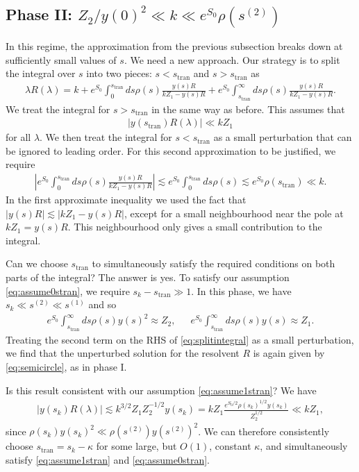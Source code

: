 \documentclass[12pt]{article}
\newcommand{\stran}{s_{\text{tran}}}
\newcommand{\smax}{s_k}
\numberwithin{equation}{section}
\begin{document}
\subsection*{Phase II: $Z_2/y(0)^2 \ll k \ll e^{S_0} \rho( s^{(2)})$}
In this regime, the approximation from the previous subsection breaks down at sufficiently small values of $s$. We need a new approach. Our strategy is to split the integral over $s$ into two pieces: $s < \stran$ and $s >s_\text{tran}$ as
\begin{align}\label{eq:splitintegral}
\lambda R(\lambda)  = k + e^{S_0}\int_0^{\stran} ds \rho(s) \frac{y(s) R}{k Z_1 - y(s) R} +  e^{S_0}\int_{\stran}^\infty ds \rho(s) \frac{y(s) R}{k Z_1 - y(s) R}.
\end{align}
We treat the integral for $s > \stran$ in the same way as before. This assumes that
\begin{align}\label{eq:assume1stran}
|y(\stran) R(\lambda)| \ll k Z_1
\end{align}
for all $\lambda$. We then treat the integral for $s < \stran$ as a small perturbation that can be ignored to leading order. For this second approximation to be justified, we require
\begin{align} \label{eq:assume0stran}
\left|e^{S_0}\int_0^{\stran} ds \rho(s) \frac{y(s) R}{k Z_1 - y(s) R}\right| \lesssim e^{S_0}\int_0^{\stran} ds \rho(s) \lesssim e^{S_0} \rho(\stran) \ll k.
\end{align}
In the first approximate inequality we used the fact that $|y(s) R| \lesssim |k Z_1 - y(s) R|$, except for a small neighbourhood near the pole at $k Z_1 = y(s) R$. This neighbourhood only gives a small contribution to the integral.

Can we choose $\stran$ to simultaneously satisfy the required conditions on both parts of the integral? The answer is yes. 
To satisfy our assumption \eqref{eq:assume0stran}, we require $\smax - \stran \gg 1$. In this phase, we have $\smax \ll s^{(2)} \ll s^{(1)}$ and so
\begin{align}
e^{S_0} \int_{\stran}^\infty ds  \rho(s) y(s)^2 \approx Z_2, \,\,\,\,\,\,\,\,\, e^{S_0} \int_{\stran}^\infty ds  \rho(s) y(s) \approx Z_1.
\end{align}
Treating the second term on the RHS of \eqref{eq:splitintegral} as a small perturbation, we find that the unperturbed solution for the resolvent $R$ is again given by \eqref{eq:semicircle}, as in phase I. 

Is this result consistent with our assumption \eqref{eq:assume1stran}? We have
\begin{align}
|y(\smax) R(\lambda)| \lesssim k^{3/2} Z_1 Z_2^{-1/2} y(\smax) = k Z_1 \frac{e^{S_0 /2} \rho({\smax})^{1/2} y(\smax)}{Z_2^{1/2}} \ll k Z_1,
\end{align}
since $\rho(\smax) y(\smax)^2 \ll \rho(s^{(2)}) y(s^{(2)})^2$. We can therefore consistently choose $\stran = \smax - \kappa$ for some large, but $O(1)$, constant $\kappa$, and simultaneously satisfy \eqref{eq:assume1stran} and \eqref{eq:assume0stran}.
\end{document}
